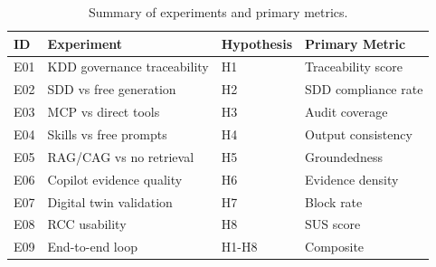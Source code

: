 \begin{table}[ht]
\centering
\caption{Summary of experiments and primary metrics.}
\label{tab:experiment-summary}
\begin{tabular}{llll}
\toprule
\textbf{ID} & \textbf{Experiment} & \textbf{Hypothesis} & \textbf{Primary Metric} \\
\midrule
E01 & KDD governance traceability & H1 & Traceability score \\
E02 & SDD vs free generation & H2 & SDD compliance rate \\
E03 & MCP vs direct tools & H3 & Audit coverage \\
E04 & Skills vs free prompts & H4 & Output consistency \\
E05 & RAG/CAG vs no retrieval & H5 & Groundedness \\
E06 & Copilot evidence quality & H6 & Evidence density \\
E07 & Digital twin validation & H7 & Block rate \\
E08 & RCC usability & H8 & SUS score \\
E09 & End-to-end loop & H1-H8 & Composite \\
\bottomrule
\end{tabular}
\end{table}
